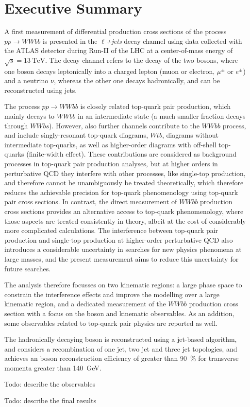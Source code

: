 \chapter*{Executive Summary}%
\label{ch:summary}

A first measurement of differential production cross sections of the process \(pp \to WWbb\) is presented in the \emph{\( \ell \)+jets} decay channel using data collected with the ATLAS detector during Run-II of the LHC at a center-of-mass energy of \(\sqrt{s} = \qty{13}{\TeV}\). 
The decay channel refers to the decay of the two \Wboson bosons, where one \Wboson boson decays leptonically into a charged lepton (muon or electron, \( \mu^\pm \) or \( e^\pm \)) and a neutrino \( \nu \), whereas the other one decays hadronically, and can be reconstructed using jets.

The process \(pp \to WWbb\) is closely related top-quark pair production, which mainly decays to \(WWbb\) in an intermediate state (a much smaller fraction decays through \(WWbs\)). 
However, also further channels contribute to the \(WWbb\) process, and include singly-resonant top-quark diagrams, \(Wtb\), diagrams without intermediate top-quarks, as well as higher-order diagrams with off-shell top-quarks (finite-width effect). These contributions are considered as background processes in top-quark pair production analyses, but at higher orders in perturbative QCD they interfere with other processes, like single-top production, and therefore cannot be unambiguously be treated theoretically, which therefore reduces the achievable precision for top-quark phenomenology using top-quark pair cross sections. In contrast, the direct measurement of \(WWbb\) production cross sections provides an alternative access to top-quark phenomenology, where those aspects are treated consistently in theory, albeit at the cost of considerably more complicated calculations.
The interference between top-quark pair production and single-top production at higher-order perturbative QCD also introduces a considerable uncertainty in searches for new physics phenomena at large masses, and the present measurement aims to reduce this uncertainty for future searches.

The analysis therefore focusses on two kinematic regions: a large phase space to constrain the interference effects and improve the modelling over a large kinematic region, and a dedicated measurement of the \(WWbb\) production cross section with a focus on the \Wboson boson and \bjet kinematic observables. As an addition, some observables related to top-quark pair physics are reported as well.

The hadronically decaying \Wboson boson is reconstructed using a jet-based algorithm, and considers a recombination of one jet, two jet and three jet topologies, and achieves an \Wboson boson reconstruction efficiency of greater than \qty{90}{\%} for transverse momenta greater than \qty{140}{\GeV}.

{Todo: describe the observables}

{Todo: describe the final results}
